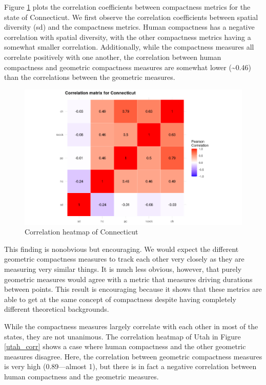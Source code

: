\documentclass[]{article}
\begin{document}
Figure \ref{connecticut_corr} plots the correlation coefficients between
compactness metrics for the state of Connecticut. We first observe the
correlation coefficients between spatial diversity (sd) and the
compactness metrics. Human compactness has a negative correlation with
spatial diversity, with the other compactness metrics having a somewhat
smaller correlation. Additionally, while the compactness measures all
correlate positively with one another, the correlation between human
compactness and geometric compactness measures are somewhat lower
(\textasciitilde{}0.46) than the correlations between the geometric
measures.

\begin{figure}
\centering
\includegraphics{../30_results/corr_matrix_connecticut.png}
\caption{Correlation heatmap of Connecticut \label{connecticut_corr}}
\end{figure}

This finding is nonobvious but encouraging. We would expect the
different geometric compactness measures to track each other very
closely as they are measuring very similar things. It is much less
obvious, however, that purely geometric measures would agree with a
metric that measures driving durations between points. This result is
encouraging because it shows that these metrics are able to get at the
same concept of compactness despite having completely different
theoretical backgrounds.

While the compactness measures largely correlate with each other in most
of the states, they are not unanimous. The correlation heatmap of Utah
in Figure \ref{utah_corr} shows a case where human compactness and the
other geometric measures disagree. Here, the correlation between
geometric compactness measures is very high (0.89---almost 1), but there
is in fact a negative correlation between human compactness and the
geometric measures.
\end{document}
